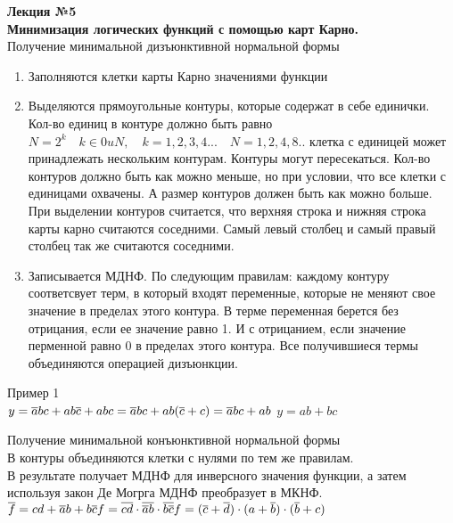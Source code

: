 \LARGE{ \textbf {Лекция №5}}\\

\Large{ \textbf { Минимизация логических функций с помощью карт Карно. }}\\
Получение минимальной дизъюнктивной нормальной формы
\begin{enumerate}
  \item Заполняются клетки карты Карно значениями функции
  \item Выделяются прямоугольные контуры, которые содержат в себе единички.
  Кол-во единиц в контуре должно быть равно $ N = 2^k \quad k \in 0 uN, \quad k = 1,2,3,4... \quad N = 1,2,4,8..$ клетка с единицей может принадлежать нескольким контурам. Контуры могут пересекаться. Кол-во контуров должно быть как можно меньше, но при условии, что все клетки с единицами охвачены. А размер контуров должен быть как можно больше. При выделении контуров считается, что верхняя строка и нижняя строка карты карно считаются соседними.
  Самый левый столбец и самый правый столбец так же считаются соседними.
  \item Записывается МДНФ. По следующим правилам: каждому контуру соответсвует терм, в который входят переменные, которые не меняют свое значение в пределах этого контура. В терме переменная берется без отрицания, если ее значение равно 1.
  И с отрицанием, если значение перменной равно 0  в пределах этого контура. Все получившиеся термы объединяются операцией дизъюнкции.
\end{enumerate}

Пример 1\\
$ y = \overline{a}bc + ab\overline{c} + abc \\
= \overline{a}bc + ab(\overline{c}+c)\\
= \overline{a}bc + ab\\
$
$
y = ab + bc
$


Получение минимальной конъюнктивной нормальной формы\\
В контуры объединяются клетки с нулями по тем же правилам.\\
В результате получает МДНФ для инверсного значения функции, а затем используя закон Де Могрга МДНФ преобразует в МКНФ.\\
$
\overline{f} = cd + \overline{a}b + b\overline{c} \\
f = \overline{cd} \cdot \overline{ \overline{a} b } \cdot \overline{b \overline{c}} \\
f = (\overline{c} + \overline{d}) \cdot (a + \overline{b}) \cdot (\overline{b} + c)
$

